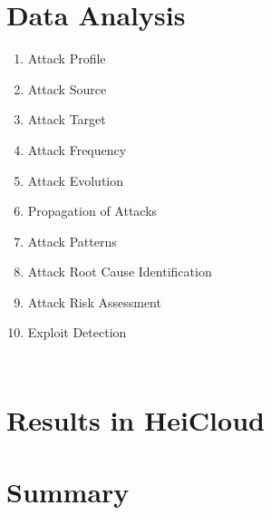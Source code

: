 
\section{Data Analysis}

\begin{enumerate}
    \item Attack Profile
    \item Attack Source
    \item Attack Target
    \item Attack Frequency
    \item Attack Evolution
    \item Propagation of Attacks
    \item Attack Patterns
    \item Attack Root Cause Identification
    \item Attack Risk Assessment
    \item Exploit Detection
\end{enumerate}

\begin{table}[h]
    \centering
    \caption{}
    \begin{tabularx}{\linewidth}{l}
        \toprule
        \bottomrule
    \end{tabularx}
    \label{tab:overview-data-analysis}
\end{table}


\section{Results in HeiCloud}



\section{Summary}